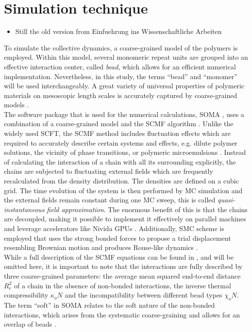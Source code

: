 \documentclass[bachelor,       %
               twoside,        %
               BCOR10mm,       %
               ngerman, english %
               ]{GAUBM}
\begin{document}
\chapter{Simulation technique}
\begin{itemize}
    \item Still the old version from Einfuehrung ins Wissenschaftliche Arbeiten
\end{itemize}
To simulate the collective dynamics, a coarse-grained model of the polymers is employed. Within this model, several monomeric repeat units are grouped into an effective interaction center, called \textit{bead}, which allows for an efficient numerical implementation. Nevertheless, in this study, the terms \enquote{bead} and \enquote{monomer} will be used interchangeably. A great variety of universal properties of polymeric materials on mesoscopic length scales is accurately captured by coarse-grained models \cite{Baschnagel03}.\\
The software package that is used for the numerical calculations, \ac{SOMA} \cite{Schneider_soma}, uses a combination of a coarse-grained model and the \ac{SCMF} algorithm \cite{Daoulas06}. Unlike the widely used \ac{SCFT}, the \ac{SCMF} method includes fluctuation effects which are required to accurately describe certain systems and effects, e.g. dilute polymer solutions, the vicinity of phase transitions, or polymeric microemulsions \cite{Bates97, Mueller02, Schmid03}. Instead of calculating the interaction of a chain with all its surrounding explicitly, the chains are subjected to fluctuating external fields which are frequently recalculated from the density distribution. The densities are defined on a cubic grid. The time evolution of the system is then performed by \ac{MC} simulation and the external fields remain constant during one \ac{MC} sweep, this is called \textit{quasi-instantaneous field approximation}. The enormous benefit of this is that the chains are decoupled, making it possible to implement it effectively on parallel machines and leverage accelerators like Nivida \acp{GPU} \cite{Schneider_soma}. Additionally, \ac{SMC} scheme is employed that uses the strong bonded forces to propose a trial displacement resembling Brownian motion and produces Rouse-like dynamics \cite{Pangali78,Rossky78}.\\
While a full description of the \ac{SCMF} equations can be found in \cite{Daoulas06}, and will be omitted here, it is important to note that the interactions are fully described by three coarse-grained parameters: the average mean squared end-to-end distance $R_{e}^2$ of a chain in the absence of non-bonded interactions, the inverse thermal compressibility $\kappa_o N$ and the incompatibility between different bead types $\chi_o N$. The term \enquote{soft} in \ac{SOMA} relates to the soft nature of the non-bonded interactions, which arises from the systematic coarse-graining and allows for an overlap of beads \cite{Mueller11soft}.
\end{document}
